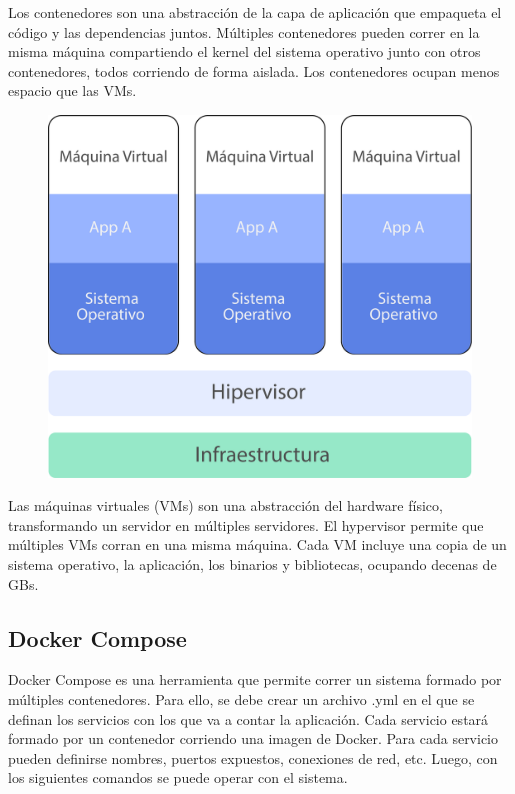 \break

Los contenedores son una abstracción de la capa de aplicación que empaqueta el código y las dependencias juntos. Múltiples contenedores pueden correr en la misma máquina compartiendo el kernel del sistema operativo junto con otros contenedores, todos corriendo de forma aislada. Los contenedores ocupan menos espacio que las VMs.

\begin{figure}[h!]
  \centering
    \includegraphics[scale=0.7]{images/vms.png}
  \label{fig:vm}
\end{figure}

\break

Las máquinas virtuales (VMs) son una abstracción del hardware físico, transformando un servidor en múltiples servidores. El hypervisor permite que múltiples VMs corran en una misma máquina. Cada VM incluye una copia de un sistema operativo, la aplicación, los binarios y bibliotecas, ocupando decenas de GBs.


\subsection[Docker Compose]{Docker Compose}

Docker Compose es una herramienta que permite correr un sistema formado por múltiples contenedores. Para ello, se debe crear un archivo .yml en el que se definan los servicios con los que va a contar la aplicación. Cada servicio estará formado por un contenedor corriendo una imagen de Docker. 
Para cada servicio pueden definirse nombres, puertos expuestos, conexiones de red, etc. Luego, con los siguientes comandos se puede operar con el sistema.

